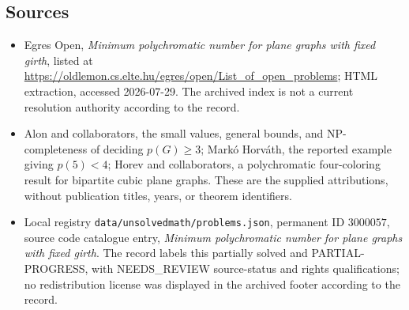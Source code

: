 \documentclass[11pt]{article}
\begin{document}
\subsection{Sources}
\begin{itemize}
\item Egres Open, \emph{Minimum polychromatic number for plane graphs with fixed girth}, listed at \url{https://oldlemon.cs.elte.hu/egres/open/List_of_open_problems}; HTML extraction, accessed 2026-07-29. The archived index is not a current resolution authority according to the record.
\item Alon and collaborators, the small values, general bounds, and NP-completeness of deciding $p(G)\geq3$; Markó Horváth, the reported example giving $p(5)<4$; Horev and collaborators, a polychromatic four-coloring result for bipartite cubic plane graphs. These are the supplied attributions, without publication titles, years, or theorem identifiers.
\item Local registry \texttt{data/unsolvedmath/problems.json}, permanent ID $3000057$, source code catalogue entry, \emph{Minimum polychromatic number for plane graphs with fixed girth}. The record labels this partially solved and PARTIAL-PROGRESS, with NEEDS\_REVIEW source-status and rights qualifications; no redistribution license was displayed in the archived footer according to the record.
\end{itemize}
\end{document}
